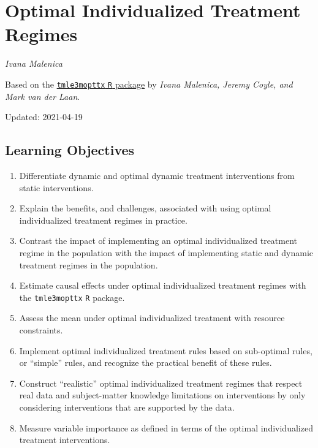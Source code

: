 \documentclass[12pt, krantz2,]{krantz}
\providecommand{\tightlist}{%
  \setlength{\itemsep}{0pt}\setlength{\parskip}{0pt}}
\theoremstyle{definition}
\theoremstyle{definition}
\theoremstyle{definition}
\newcommand{\1}{\mathbbm{1}}
\begin{document}
\hypertarget{optimal-individualized-treatment-regimes}{%
\section{Optimal Individualized Treatment Regimes}\label{optimal-individualized-treatment-regimes}}

\emph{Ivana Malenica}

Based on the \href{https://github.com/tlverse/tmle3mopttx}{\texttt{tmle3mopttx} \texttt{R} package}
by \emph{Ivana Malenica, Jeremy Coyle, and Mark van der Laan}.

Updated: 2021-04-19

\hypertarget{learning-objectives-4}{%
\subsection{Learning Objectives}\label{learning-objectives-4}}

\begin{enumerate}
\def\labelenumi{\arabic{enumi}.}
\tightlist
\item
  Differentiate dynamic and optimal dynamic treatment interventions from static
  interventions.
\item
  Explain the benefits, and challenges, associated with using optimal
  individualized treatment regimes in practice.
\item
  Contrast the impact of implementing an optimal individualized treatment
  regime in the population with the impact of implementing static and dynamic
  treatment regimes in the population.
\item
  Estimate causal effects under optimal individualized treatment regimes with
  the \texttt{tmle3mopttx} \texttt{R} package.
\item
  Assess the mean under optimal individualized treatment with resource
  constraints.
\item
  Implement optimal individualized treatment rules based on sub-optimal
  rules, or ``simple'' rules, and recognize the practical benefit of these rules.
\item
  Construct ``realistic'' optimal individualized treatment regimes that respect
  real data and subject-matter knowledge limitations on interventions by
  only considering interventions that are supported by the data.
\item
  Measure variable importance as defined in terms of the optimal individualized
  treatment interventions.
\end{enumerate}
\end{document}
